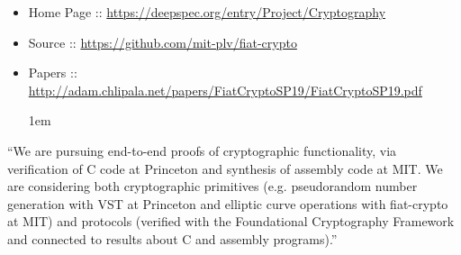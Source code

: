 \documentclass[12pt,twoside]{article}
\begin{document}
\begin{itemize}[noitemsep,topsep=\mdcompacttopsep]%

\item{}Home Page :: \href{https://deepspec.org/entry/Project/Cryptography}{{\ttfamily https://\hspace{0pt}deepspec.\hspace{0pt}org/\hspace{0pt}entry/\hspace{0pt}Project/\hspace{0pt}Cryptography}}%

\item{}Source :: \href{https://github.com/mit-plv/fiat-crypto}{{\ttfamily https://\hspace{0pt}github.\hspace{0pt}com/\hspace{0pt}mit-\hspace{0pt}plv/\hspace{0pt}fiat-\hspace{0pt}crypto}}%

\item{}Papers :: \href{http://adam.chlipala.net/papers/FiatCryptoSP19/FiatCryptoSP19.pdf}{{\ttfamily http://\hspace{0pt}adam.\hspace{0pt}chlipala.\hspace{0pt}net/\hspace{0pt}papers/\hspace{0pt}FiatCryptoSP19/\hspace{0pt}FiatCryptoSP19.\hspace{0pt}pdf}}
\begin{mdpre}%
\begin{mdbmarginx}{}{}{}{1em}%
\end{mdbmarginx}%
\end{mdpre}%
\end{itemize}%

\noindent{}\textquotedblleft{}We are pursuing end-to-end proofs of cryptographic functionality, via
verification of C code at Princeton and synthesis of assembly code at
MIT.  We are considering both cryptographic primitives
(e.g. pseudorandom number generation with VST at Princeton and
elliptic curve operations with fiat-crypto at MIT) and protocols
(verified with the Foundational Cryptography Framework and connected
to results about C and assembly programs).\textquotedblright{}%
\end{document}
